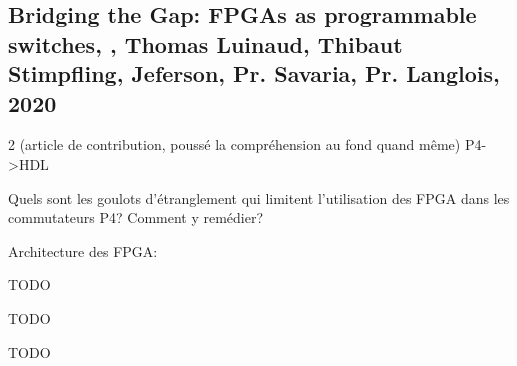 
\subsection{Bridging the Gap: FPGAs as programmable switches, \cite{luinaud_bridging_2020}, Thomas Luinaud, Thibaut Stimpfling, Jeferson, Pr. Savaria, Pr. Langlois, 2020}
 2 (article de contribution, poussé la compréhension au fond quand même)
 P4->HDL

 Quels sont les goulots d'étranglement qui limitent l'utilisation des FPGA dans les commutateurs P4? Comment y remédier?

 Architecture des FPGA: \cite{chang_device_2008}

 TODO

 TODO

 TODO

\clearpage
